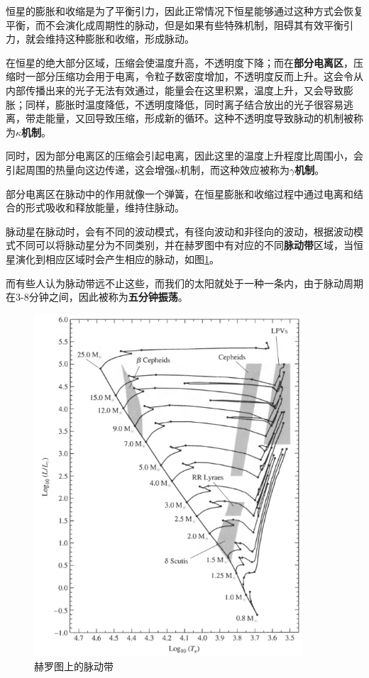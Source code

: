 \documentclass[openany]{ctexbook}
\begin{document}
恒星的膨胀和收缩是为了平衡引力，因此正常情况下恒星能够通过这种方式会恢复平衡，而不会演化成周期性的脉动，但是如果有些特殊机制，阻碍其有效平衡引力，就会维持这种膨胀和收缩，形成脉动。

在恒星的绝大部分区域，压缩会使温度升高，不透明度下降；而在\textbf{部分电离区}，压缩时一部分压缩功会用于电离，令粒子数密度增加，不透明度反而上升。这会令从内部传播出来的光子无法有效通过，能量会在这里积累，温度上升，又会导致膨胀；同样，膨胀时温度降低，不透明度降低，同时离子结合放出的光子很容易逃离，带走能量，又回导致压缩，形成新的循环。这种不透明度导致脉动的机制被称为\textbf{$\kappa$机制}。

同时，因为部分电离区的压缩会引起电离，因此这里的温度上升程度比周围小，会引起周围的热量向这边传递，这会增强$\kappa$机制，而这种效应被称为\textbf{$\gamma$机制}。

部分电离区在脉动中的作用就像一个弹簧，在恒星膨胀和收缩过程中通过电离和结合的形式吸收和释放能量，维持住脉动。

脉动星在脉动时，会有不同的波动模式，有径向波动和非径向的波动，根据波动模式不同可以将脉动星分为不同类别，并在赫罗图中有对应的不同\textbf{脉动带}区域，当恒星演化到相应区域时会产生相应的脉动，如图\ref{fig:pusating}。

而有些人认为脉动带远不止这些，而我们的太阳就处于一种一条内，由于脉动周期在3-8分钟之间，因此被称为\textbf{五分钟振荡}。

\begin{figure}[hbt]
  \centering
  \includegraphics[width=10cm]{chapters/14/pusating}
  \caption{赫罗图上的脉动带}
  \label{fig:pusating}
\end{figure}
\end{document}
